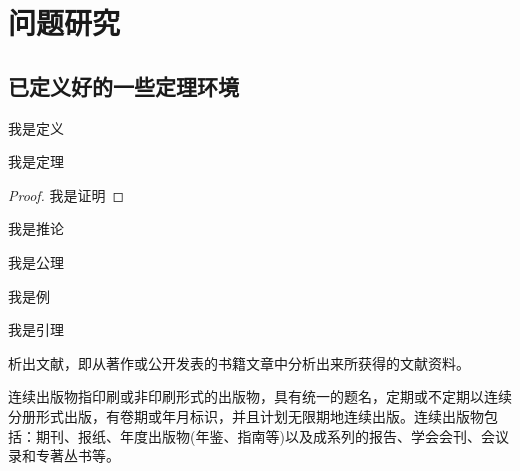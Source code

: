 \chapter{问题研究}


\section{已定义好的一些定理环境}


\begin{definition}
  我是定义
\end{definition}

\begin{theorem}
  我是定理
\end{theorem}

\begin{proof}
  我是证明
\end{proof}

\begin{corollary}
  我是推论
\end{corollary}

\begin{axiom}
  我是公理
\end{axiom}


\begin{example}
  我是例
\end{example}

\begin{lemma}
  我是引理
\end{lemma}

析出文献，即从著作或公开发表的书籍文章中分析出来所获得的文献资料。

连续出版物指印刷或非印刷形式的出版物，具有统一的题名，定期或不定期以连续分册形式出版，有卷期或年月标识，并且计划无限期地连续出版。连续出版物包括：期刊、报纸、年度出版物(年鉴、指南等)以及成系列的报告、学会会刊、会议录和专著丛书等。
\parencite{李晓东,Ahn,丁文祥,张启发,雷光春,邱泽奇,zhang,唐绪军,昂温,Foth,杨国枢,Morison,张志祥,Aldemita,张凯军,Kosek,文献编写,国防白皮,federal,health,江向东,萧钮,PACS-L}
